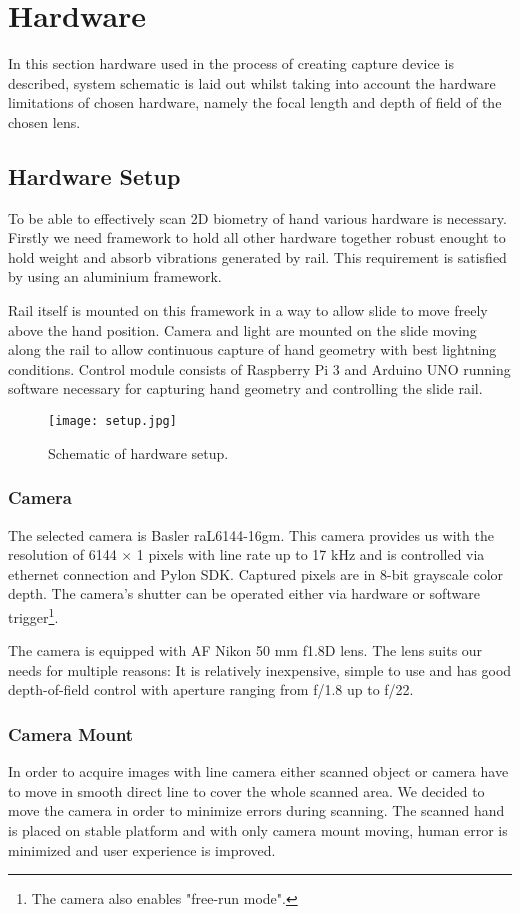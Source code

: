 \section{Hardware}
\label{sec:hw}

In this section hardware used in the process of creating capture device is described, system schematic is laid out whilst taking into account the hardware limitations of chosen hardware, namely the focal length and depth of field of the chosen lens.

\subsection{Hardware Setup}
To be able to effectively scan 2D biometry of hand various hardware is necessary. Firstly we need framework to hold all other hardware together robust enought to hold weight and absorb vibrations generated by rail. This requirement is satisfied by using an aluminium framework.

Rail itself is mounted on this framework in a way to allow slide to move freely above the hand position. Camera and light are mounted on the slide moving along the rail to allow continuous capture of hand geometry with best lightning conditions.
Control module consists of Raspberry Pi 3 and Arduino UNO running software necessary for capturing hand geometry and controlling the slide rail.
\begin{figure}[ht!]
    \label{fig:setup}
    \centering
    \texttt{[image: setup.jpg]}
    \caption{Schematic of hardware setup.}
\end{figure}

\subsubsection*{Camera}
The selected camera is Basler raL6144-16gm. This camera provides us with the resolution of 6144 $\times$ 1 pixels with line rate up to 17 kHz and is controlled via ethernet connection and Pylon SDK.
Captured pixels are in 8-bit grayscale color depth. The camera's shutter can be operated either via hardware or software trigger\footnote{The camera also enables "free-run mode".}.

The camera is equipped with AF Nikon 50 mm f1.8D lens. The lens suits our needs for multiple reasons:
It is relatively inexpensive, simple to use and has good depth-of-field control with aperture ranging from f/1.8 up to f/22.

\subsubsection*{Camera Mount}
In order to acquire images with line camera either scanned object or camera have to move in smooth direct line to cover the whole scanned area.
We decided to move the camera in order to minimize errors during scanning. The scanned hand is placed on stable platform and with only camera mount moving,
human error is minimized and user experience is improved.

